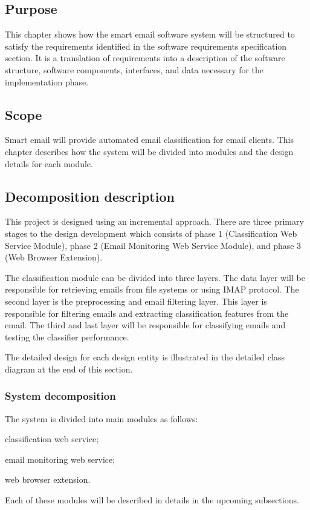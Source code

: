 \subsection{Purpose}
This chapter shows how the smart email software system will be 
structured to satisfy the requirements identified in the software
requirements specification section. It is a translation of 
requirements into a description of the software structure, software components, 
interfaces, and data necessary for the implementation phase.

\subsection{Scope}
Smart email will provide automated email classification for email clients. 
This chapter describes how the system will be divided into modules and 
the design details for each module.


\subsection{Decomposition description}
This project is designed using an incremental approach. There are three
primary  stages to the design development which consists of phase 1 
(Classification Web Service Module), phase 2 (Email Monitoring Web Service Module),
and phase 3 (Web Browser Extension).

The classification module can be divided into three layers. The data layer will be 
responsible for retrieving emails from file systems or using IMAP protocol. The 
second layer is the preprocessing and email filtering layer. This layer is 
responsible for filtering emails and extracting classification features from the 
email. The third and last layer will be responsible for classifying emails and 
testing the classifier performance.

The detailed design for each design entity is illustrated in the detailed class 
diagram at the end of this section.

\subsubsection{System decomposition}
The system is divided into main modules as follows:
\begin{my_itemize}
  \item classification web service;
  \item email monitoring web service;
  \item web browser extension.
\end{my_itemize}
Each of these modules will be described in details in the upcoming subsections.

